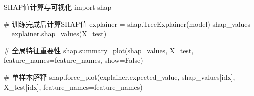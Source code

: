 \begin{Python}{SHAP值计算与可视化}
import shap

# 训练完成后计算SHAP值
explainer = shap.TreeExplainer(model)
shap_values = explainer.shap_values(X_test)

# 全局特征重要性
shap.summary_plot(shap_values, X_test,
                  feature_names=feature_names,
                  show=False)

# 单样本解释
shap.force_plot(explainer.expected_value,
                shap_values[idx],
                X_test[idx],
                feature_names=feature_names)
\end{Python}
